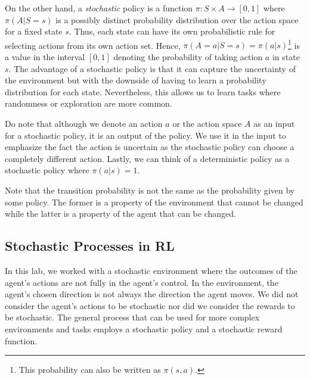 On the other hand, a \emph{stochastic} policy is a function $\pi: S\times A\to [0,1]$ where $\pi(A|S=s)$ is a possibly distinct probability distribution over the action space for a fixed state $s$.
Thus, each state can have its own probabilistic rule for selecting actions from its own action set.
Hence, $\pi(A=a|S=s)=\pi(a|s)$\footnote{This probability can also be written as $\pi(s,a)$.} is a value in the interval $[0,1]$ denoting the probability of taking action $a$ in state $s$.
The advantage of a stochastic policy is that it can capture the uncertainty of the environment but with the downside of having to learn a probability distribution for each state.
Nevertheless, this allows us to learn tasks where randomness or exploration are more common.

Do note that although we denote an action $a$ or the action space $A$ as an input for a stochastic policy, it is an output of the policy.
We use it in the input to emphasize the fact the action is uncertain as the stochastic policy can choose a completely different action.
Lastly, we can think of a deterministic policy as a stochastic policy where $\pi(a|s)=1$.

\begin{warn}
    Note that the transition probability is not the same as the probability given by some policy.
    The former is a property of the environment that cannot be changed while the latter is a property of the agent that can be changed.
\end{warn}

\subsection*{Stochastic Processes in RL}
In this lab, we worked with a stochastic environment where the outcomes of the agent's actions are not fully in the agent's control.
In the  environment, the agent's chosen direction is not always the direction the agent moves.
We did not consider the agent's actions to be stochastic nor did we consider the rewards to be stochastic.
The general process that can be used for more complex environments and tasks employs a stochastic policy and a stochastic reward function.


